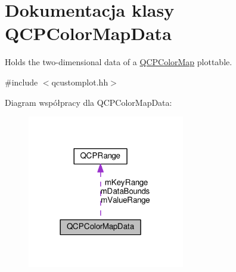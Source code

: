 \hypertarget{class_q_c_p_color_map_data}{}\section{Dokumentacja klasy Q\+C\+P\+Color\+Map\+Data}
\label{class_q_c_p_color_map_data}


Holds the two-\/dimensional data of a \hyperlink{class_q_c_p_color_map}{Q\+C\+P\+Color\+Map} plottable.  




{\ttfamily \#include $<$qcustomplot.\+hh$>$}



Diagram współpracy dla Q\+C\+P\+Color\+Map\+Data\+:\nopagebreak
\begin{figure}[H]
\begin{center}
\leavevmode
\includegraphics[width=194pt]{class_q_c_p_color_map_data__coll__graph}
\end{center}
\end{figure}
